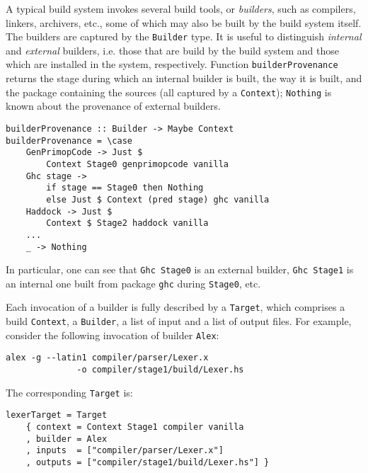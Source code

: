 A typical build system invokes several build tools, or \emph{builders}, such as
compilers, linkers, archivers, etc., some of which may also be built by the
build system itself. The builders are captured by the \texttt{Builder} type. It
is useful to distinguish \emph{internal} and \emph{external} builders, i.e.
those that are build by the build system and those which are installed in the
system, respectively. Function \texttt{builderProvenance} returns the stage
during which an internal builder is built, the way it is built, and the package
containing the sources (all captured by a \texttt{Context}); \texttt{Nothing} is
known about the provenance of external builders.

\begin{lstlisting}[basicstyle=\ttfamily]
builderProvenance :: Builder -> Maybe Context
builderProvenance = \case
    GenPrimopCode -> Just $
        Context Stage0 genprimopcode vanilla
    Ghc stage ->
        if stage == Stage0 then Nothing
        else Just $ Context (pred stage) ghc vanilla
    Haddock -> Just $
        Context $ Stage2 haddock vanilla
    ...
    _ -> Nothing
\end{lstlisting}

In particular, one can see that \texttt{Ghc Stage0} is an external builder,
\texttt{Ghc Stage1} is an internal one built from package \texttt{ghc}
during \texttt{Stage0}, etc.

Each invocation of a builder is fully described by a \texttt{Target}, which
comprises a build \texttt{Context}, a \texttt{Builder}, a list of input and
a list of output files. For example, consider the following invocation of
builder \texttt{Alex}:

\begin{verbatim}
alex -g --latin1 compiler/parser/Lexer.x
              -o compiler/stage1/build/Lexer.hs
\end{verbatim}

\noindent The corresponding \texttt{Target} is:

\begin{lstlisting}[basicstyle=\ttfamily]
lexerTarget = Target
    { context = Context Stage1 compiler vanilla
    , builder = Alex
    , inputs  = ["compiler/parser/Lexer.x"]
    , outputs = ["compiler/stage1/build/Lexer.hs"] }
\end{lstlisting}


